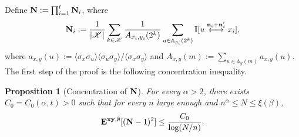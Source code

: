 \documentclass[a4paper,oneside,11pt]{article}
\newtheorem{proposition}[theorem]{Proposition}
\numberwithin{equation}{section}
\numberwithin{equation}{section}
\numberwithin{equation}{section}
\newcommand{\calK}{\mathcal{K}}
\newcommand{\bbA}{\mathbb{A}}
\newcommand{\n}{\mathbf{n}}
\begin{document}
 
Define ${\bf N}:=\prod_{i=1}^t{\bf N}_i$, 
where
\begin{equation}{\bf N}_i:=\frac1{|\calK|}\sum_{k\in \calK}\frac{1}{A_{x_i,y_i}(2^k)}\sum_{u\in\bbA_{y_i}(2^k)}\mathbb I[u\stackrel{\n_i+\n'_i}\longleftrightarrow x_i],
\end{equation}
where
$
a_{x,y}(u):=\langle\sigma_x\sigma_u\rangle\langle\sigma_u\sigma_y\rangle/\langle\sigma_x\sigma_y\rangle$ and $ A_{x,y}(m):=\sum_{u\in \bbA_{y}(m)}a_{x,y}(u)$.
The first step of the proof is the following concentration inequality.
\begin{proposition}[Concentration of ${\bf N}$]\label{lem:concentration}
For every $\alpha>2$, there exists $C_0=C_0(\alpha,t)>0$ such that for every $n$ large enough and $n^\alpha\le N\le\xi(\beta)$,
\begin{equation}
{\bf E}^{{\bf xy},\emptyset}[({\bf N}-1)^2]\le \frac{C_0}{\log(N/n)}.
\end{equation}
\end{proposition}
\end{document}
